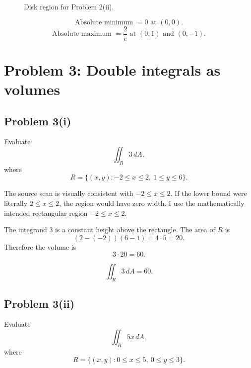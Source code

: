 \documentclass[11pt,a4paper]{article}
\begin{document}
\begin{figure}[H]
\centering
{}
\caption{Disk region for Problem 2(ii).}
\end{figure}

\begin{answerbox}
\[
\boxed{\text{Absolute minimum }=0\text{ at }(0,0).}
\]
\[
\boxed{\text{Absolute maximum }=\frac2e\text{ at }(0,1)\text{ and }(0,-1).}
\]
\end{answerbox}

\section{Problem 3: Double integrals as volumes}

\subsection{Problem 3(i)}
Evaluate
\[
 \iint_R 3\,dA,
\]
where
\[
 R=\{(x,y):-2\le x\le2,
\ 1\le y\le6\}.
\]

\begin{notebox}
The source scan is visually consistent with \(-2\le x\le2\).  If the lower bound were literally \(2\le x\le2\), the region would have zero width.  I use the mathematically intended rectangular region \(-2\le x\le2\).
\end{notebox}

The integrand \(3\) is a constant height above the rectangle.  The area of \(R\) is
\[
 (2-(-2))(6-1)=4\cdot5=20.
\]
Therefore the volume is
\[
 3\cdot20=60.
\]

\begin{answerbox}
\[
\boxed{\iint_R3\,dA=60.}
\]
\end{answerbox}

\subsection{Problem 3(ii)}
Evaluate
\[
 \iint_R 5x\,dA,
\]
where
\[
 R=\{(x,y):0\le x\le5,
\ 0\le y\le3\}.
\]
\end{document}
